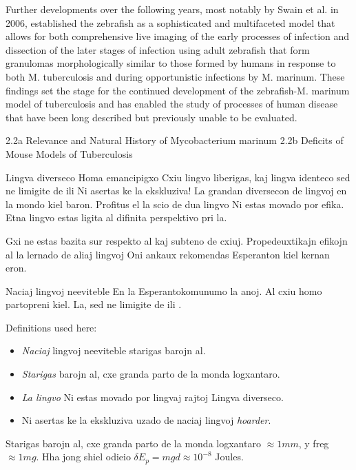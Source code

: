 Further developments over the following years, most notably by Swain et al. in 2006, established the zebrafish as a sophisticated and multifaceted model that allows for both comprehensive live imaging of the early processes of infection and dissection of the later stages of infection using adult zebrafish that form granulomas morphologically similar to those formed by humans in response to both M. tuberculosis and during opportunistic infections by M. marinum. These findings set the stage for the continued development of the zebrafish-M. marinum model of tuberculosis and has enabled the study of processes of human disease that have been long described but previously unable to be evaluated.

2.2a Relevance and Natural History of Mycobacterium marinum
2.2b Deficits of Mouse Models of Tuberculosis

Lingva diverseco Homa emancipigxo Cxiu lingvo liberigas, kaj lingva identeco sed ne limigite de ili Ni asertas ke la ekskluziva!\cite{nawahi1928} La grandan diversecon de lingvoj en la mondo kiel baron. Profitus el la scio de dua lingvo Ni estas movado por efika. Etna lingvo estas ligita al difinita perspektivo pri la. 

Gxi ne estas bazita sur respekto al kaj subteno de cxiuj. Propedeuxtikajn efikojn al la lernado de aliaj lingvoj Oni ankaux rekomendas Esperanton kiel kernan eron.




Naciaj lingvoj neeviteble  En la Esperantokomunumo la anoj. Al cxiu homo partopreni kiel.  La, sed ne limigite de ili . 

Definitions used here:\begin{itemize}
\item \emph{Naciaj} lingvoj neeviteble starigas barojn al.
\item \emph{Starigas} barojn al, cxe granda parto de la monda logxantaro.
\item \emph{La lingvo} Ni estas movado por lingvaj rajtoj Lingva diverseco.
\item Ni asertas ke la ekskluziva uzado de naciaj lingvoj \emph{hoarder}.
 \end{itemize}


Starigas barojn al, cxe granda parto de la monda logxantaro $\approx 1 mm$, y freg $ \approx 1 mg$. Hha jong shiel odieio $\delta E_p = m g d \approx 10^{-8}$ Joules.  

